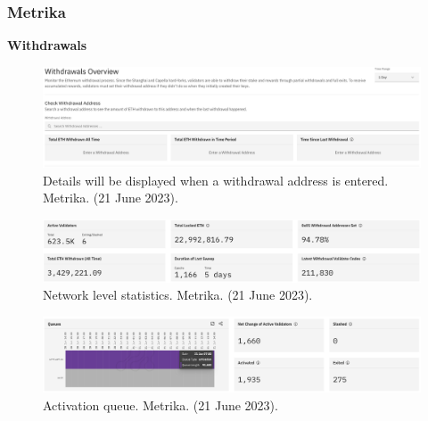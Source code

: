 \documentclass[UTF8]{article}
\begin{document}
\clearpage
\subsubsection*{Metrika}
\textbf{Withdrawals}
\begin{figure}[htbp]
\begin{center}
\includegraphics[width=0.9\linewidth]{images/metrika1}
\caption{Details will be displayed when a withdrawal address is entered. Metrika. (21 June 2023). }
\label{fig:metrika1}
\end{center}
\end{figure}

\begin{figure}[htbp]
\begin{center}
\includegraphics[width=0.9\linewidth]{images/metrika2}
\caption{Network level statistics. Metrika. (21 June 2023). }
\label{fig:metrika2}
\end{center}
\end{figure}

\begin{figure}[htbp]
\begin{center}
\includegraphics[width=0.9\linewidth]{images/metrika3}
\caption{Activation queue. Metrika. (21 June 2023). }
\label{fig:metrika3}
\end{center}
\end{figure}
\end{document}
